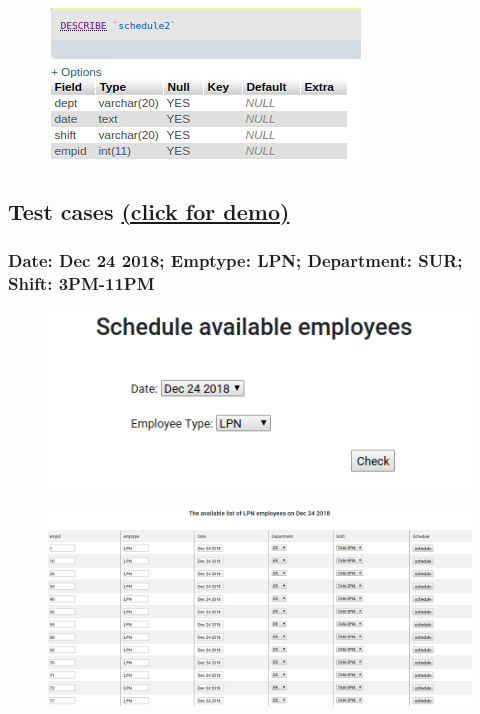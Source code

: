 \documentclass[11pt]{article}
\makeatletter
\def\maxwidth{\ifdim\Gin@nat@width>\linewidth\linewidth
    \else\Gin@nat@width\fi}
\let\Oldincludegraphics\includegraphics
\renewcommand{\includegraphics}[1]{\Oldincludegraphics[width=.8\maxwidth]{#1}}
\makeatother
\begin{document}
\begin{figure}[H]
\centering
\includegraphics{3.png}
\caption{}
\end{figure}

    \subsection*{\texorpdfstring{Test cases \href{http://cs431project-jxy225.herokuapp.com/view/schedule_emptype_display.php}{(click for
demo)}}{test cases (click for demo)}}\label{test-cases-click-for-demo}

    \subsubsection*{Date: Dec 24 2018; Emptype: LPN; Department: SUR; Shift:
3PM-11PM}\label{date-dec-24-2018-emptype-lpn-department-sur-shift-3pm-11pm}

    \begin{figure}[H]
\centering
\includegraphics{4.png}
\caption{}
\end{figure}

\begin{figure}[H]
\centering
\includegraphics{5.png}
\caption{}
\end{figure}
\end{document}
